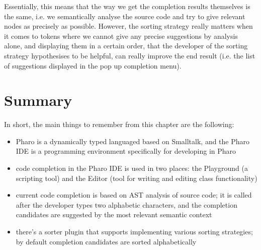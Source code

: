 Essentially, this means that the way we get the completion results themselves is the same, i.e. we semantically analyse the source code and try to give relevant nodes as precisely as possible. However, the sorting strategy really matters when it comes to tokens where we cannot give any precise suggestions by analysis alone, and displaying them in a certain order, that the developer of the sorting strategy hypothesises to be helpful, can really improve the end result (i.e. the list of suggestions displayed in the pop up completion menu).

\section{Summary}
In short, the main things to remember from this chapter are the following:
\begin{itemize}
    \item Pharo is a dynamically typed languaged based on Smalltalk, and the Pharo IDE is a programming environment specifically for developing in Pharo
    \item code completion in the Pharo IDE is used in two places: the Playground (a scripting tool) and the Editor (tool for writing and editing class functionality)
    \item current code completion is based on AST analysis of source code; it is called after the developer types two alphabetic characters, and the completion candidates are suggested by the most relevant semantic context
    \item there's a sorter plugin that supports implementing various sorting strategies; by default completion candidates are sorted alphabetically
\end{itemize}